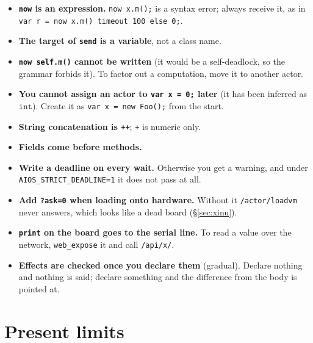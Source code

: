 \documentclass[11pt,a4paper]{article}
\newcommand{\ty}[1]{\ensuremath{\mathtt{#1}}}
\begin{document}
\begin{itemize}
\item \textbf{\texttt{now} is an expression.} \texttt{now x.m();} is a syntax
  error; always receive it, as in
  \texttt{var r = now x.m() timeout 100 else 0;}.
\item \textbf{The target of \texttt{send} is a variable}, not a class name.
\item \textbf{\texttt{now self.m()} cannot be written} (it would be a
  self-deadlock, so the grammar forbids it). To factor out a computation, move
  it to another actor.
\item \textbf{You cannot assign an actor to \texttt{var x = 0;} later}
  (it has been inferred as \ty{int}). Create it as
  \texttt{var x = new Foo();} from the start.
\item \textbf{String concatenation is \texttt{++}}; \texttt{+} is numeric only.
\item \textbf{Fields come before methods.}
\item \textbf{Write a deadline on every wait.} Otherwise you get a warning, and
  under \texttt{AIOS\_STRICT\_DEADLINE=1} it does not pass at all.
\item \textbf{Add \texttt{?ask=0} when loading onto hardware.} Without it
  \texttt{/actor/loadvm} never answers, which looks like a dead board
  (\S\ref{sec:xinu}).
\item \textbf{\texttt{print} on the board goes to the serial line.} To read a
  value over the network, \texttt{web\_expose} it and call \texttt{/api/x/}.
\item \textbf{Effects are checked once you declare them} (gradual). Declare
  nothing and nothing is said; declare something and the difference from the
  body is pointed at.
\end{itemize}

\section{Present limits}
\end{document}
